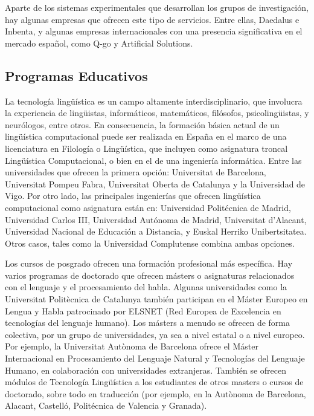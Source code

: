 \begin{multicols}{2}
Aparte de los sistemas experimentales que desarrollan los grupos de investigación, hay algunas empresas que ofrecen este tipo de servicios. Entre ellas, Daedalus e Inbenta, y algunas empresas internacionales con una presencia significativa en el mercado español, como Q-go y Artificial Solutions.

\subsection{Programas Educativos}

La tecnología lingüística es un campo altamente interdisciplinario, que involucra la experiencia de lingüistas, informáticos, matemáticos, filósofos, psicolingüistas, y neurólogos, entre otros. En consecuencia, la formación básica actual de un lingüística computacional puede ser realizada en España en el marco de una licenciatura en Filología o Lingüística, que incluyen como asignatura troncal Lingüística Computacional, o bien en el de una ingeniería informática. Entre las universidades que ofrecen la primera opción: Universitat de Barcelona, Universitat Pompeu Fabra, Universitat Oberta de Catalunya y la Universidad de Vigo. Por otro lado, las principales ingenierías que ofrecen lingüística computacional como asignatura están en: Universidad Politécnica de Madrid, Universidad Carlos III, Universidad Autónoma de Madrid, Universitat d'Alacant, Universidad Nacional de Educación a Distancia, y Euskal Herriko Unibertsitatea. Otros casos, tales como la Universidad Complutense  combina ambas opciones.

Los cursos de posgrado ofrecen una formación profesional más específica. Hay varios programas de doctorado que ofrecen másters o asignaturas relacionados con el lenguaje y el procesamiento del habla. Algunas universidades como la Universitat Politècnica de Catalunya también participan en el Máster Europeo en Lengua y  Habla patrocinado por ELSNET (Red Europea de Excelencia en tecnologías del lenguaje humano). Los másters a menudo se ofrecen de forma colectiva, por un grupo de universidades, ya sea a nivel estatal o a nivel europeo. Por ejemplo, la Universitat Autònoma de Barcelona ofrece el Máster Internacional en Procesamiento del Lenguaje Natural y Tecnologías del Lenguaje Humano, en colaboración con universidades extranjeras. También se ofrecen módulos de Tecnología Lingüística a los estudiantes de otros masters o cursos de doctorado, sobre todo en traducción (por ejemplo, en la Autònoma de Barcelona, Alacant, Castelló, Politécnica de Valencia y Granada).


\end{multicols}
